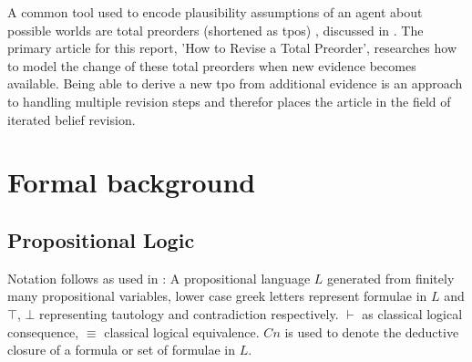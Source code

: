 \documentclass[english, 12pt]{scrartcl}
\theoremstyle{definition}
\theoremstyle{definition}
\theoremstyle{definition}
\begin{document}

A common tool used to encode plausibility assumptions of an agent about possible worlds are total preorders (shortened as tpos) \cite{Booth2011}, discussed in \cite{Katsuno1991}. The primary article for this report, 'How to Revise a Total Preorder', researches how to model the change of these total preorders when new evidence becomes available. Being able to derive a new tpo from additional evidence is an approach to handling multiple revision steps and therefor places the article in the field of iterated belief revision.

\section{Formal background}

\subsection{Propositional Logic} %
Notation follows as used in \cite{Booth2011}: A propositional language $L$ generated from finitely many propositional variables, lower case greek letters represent formulae in $L$ and $\top$, $\bot$ representing tautology and contradiction respectively. $\vdash$ as classical logical consequence, $\equiv$ classical logical equivalence. $Cn$ is used to denote the deductive closure of a formula or set of formulae in $L$.
\end{document}
